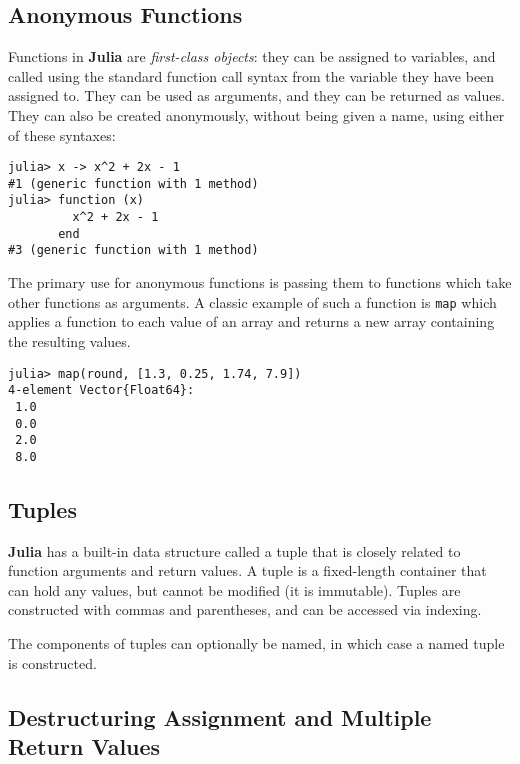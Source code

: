 \documentclass[
]{article}
\begin{document}
\hypertarget{anonymous-functions}{%
\subsection{Anonymous Functions}\label{anonymous-functions}}

Functions in \textbf{Julia} are \emph{first-class objects}: they can be
assigned to variables, and called using the standard function call
syntax from the variable they have been assigned to. They can be used as
arguments, and they can be returned as values. They can also be created
anonymously, without being given a name, using either of these syntaxes:

\begin{verbatim}
julia> x -> x^2 + 2x - 1
#1 (generic function with 1 method)
julia> function (x)
         x^2 + 2x - 1
       end
#3 (generic function with 1 method)
\end{verbatim}

The primary use for anonymous functions is passing them to functions
which take other functions as arguments. A classic example of such a
function is \texttt{map} which applies a function to each value of an
array and returns a new array containing the resulting values.

\begin{verbatim}
julia> map(round, [1.3, 0.25, 1.74, 7.9])
4-element Vector{Float64}:
 1.0
 0.0
 2.0
 8.0
\end{verbatim}

\hypertarget{tuples}{%
\subsection{Tuples}\label{tuples}}

\textbf{Julia} has a built-in data structure called a tuple that is
closely related to function arguments and return values. A tuple is a
fixed-length container that can hold any values, but cannot be modified
(it is immutable). Tuples are constructed with commas and parentheses,
and can be accessed via indexing.

The components of tuples can optionally be named, in which case a named
tuple is constructed.

\hypertarget{destructuring-assignment-and-multiple-return-values}{%
\subsection{Destructuring Assignment and Multiple Return
Values}\label{destructuring-assignment-and-multiple-return-values}}
\end{document}
